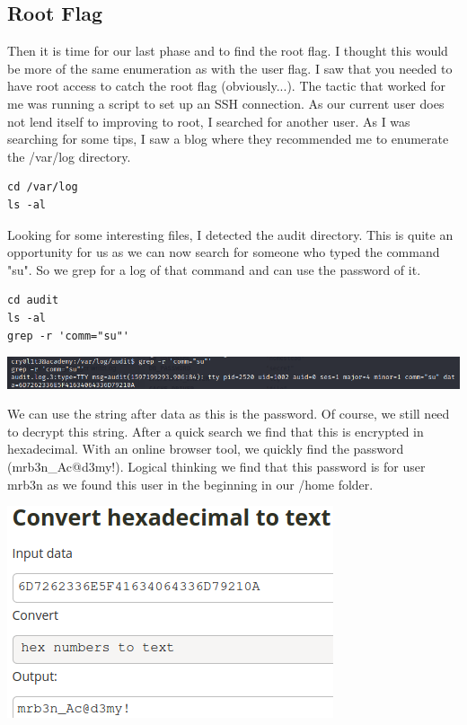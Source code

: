 \documentclass[../main.tex]{subfiles}
\begin{document}
\subsection{Root Flag}
Then it is time for our last phase and to find the root flag. I thought this would be more of the same enumeration as with the user flag. I saw that you needed to have root access to catch the root flag (obviously...). The tactic that worked for me was running a script to set up an SSH connection. As our current user does not lend itself to improving to root, I searched for another user. As I was searching for some tips, I saw a blog where they recommended me to enumerate the /var/log directory.

\begin{lstlisting}
cd /var/log
ls -al
\end{lstlisting}
Looking for some interesting files, I detected the audit directory. This is quite an opportunity for us as we can now search for someone who typed the command "su". So we grep for a log of that command and can use the password of it.
\begin{lstlisting}
cd audit
ls -al
grep -r 'comm="su"'
\end{lstlisting}
\includegraphics[width=\linewidth]{images/Robbe/Academy_root1.png}

We can use the string after data as this is the password. Of course, we still need to decrypt this string. After a quick search we find that this is encrypted in hexadecimal. With an online browser tool, we quickly find the password (mrb3n\_Ac@d3my!). Logical thinking we find that this password is for user mrb3n as we found this user in the beginning in our /home folder.

\pagebreak
\begin{center}
\includegraphics[width=0.7\linewidth]{images/Robbe/Academy_root2.png}
\end{center}
\end{document}
